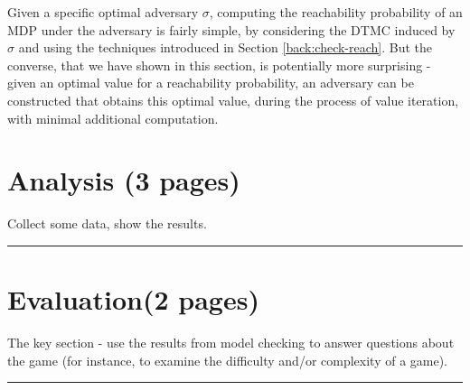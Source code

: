 Given a specific optimal adversary $\sigma$, computing the reachability probability of an MDP under the adversary is fairly simple, by considering the DTMC induced by $\sigma$ and using the techniques introduced in Section \ref{back:check-reach}. But the converse, that we have shown in this section, is potentially more surprising - given an optimal value for a reachability probability, an adversary can be constructed that obtains this optimal value, during the process of value iteration, with minimal additional computation.


\section{Analysis (3 pages)}

Collect some data, show the results.

\hrule

\Blindtext

\Blindtext

\Blindtext

\section{Evaluation(2 pages)}

The key section - use the results from model checking to answer questions about the game (for instance, to examine the difficulty and/or complexity of a game).

\hrule

\Blindtext

\Blindtext